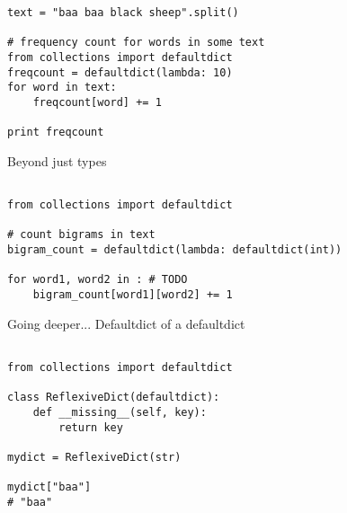 \documentclass{beamer}
\begin{document}
\begin{lrbox}{\mysavebox}
\begin{lstlisting}
text = "baa baa black sheep".split()

# frequency count for words in some text
from collections import defaultdict
freqcount = defaultdict(lambda: 10)
for word in text:
    freqcount[word] += 1

print freqcount 
\end{lstlisting}
\end{lrbox}

\begin{frame}{Beyond just types}
 
\vspace{-1em}
{\usebox{\mysavebox}}


\vspace{1em}
\end{frame}

\begin{lrbox}{\mysavebox}
\begin{lstlisting}

from collections import defaultdict

# count bigrams in text
bigram_count = defaultdict(lambda: defaultdict(int))

for word1, word2 in : # TODO
	bigram_count[word1][word2] += 1

\end{lstlisting}
\end{lrbox}

\begin{frame}{Going deeper...}
 Defaultdict of a defaultdict

\vspace{1.5em}
{\usebox{\mysavebox}}
   
\end{frame}

\begin{lrbox}{\mysavebox}
\begin{lstlisting}

from collections import defaultdict

class ReflexiveDict(defaultdict):
    def __missing__(self, key):
        return key

mydict = ReflexiveDict(str)

mydict["baa"]
# "baa"

\end{lstlisting}
\end{lrbox}
\end{document}
